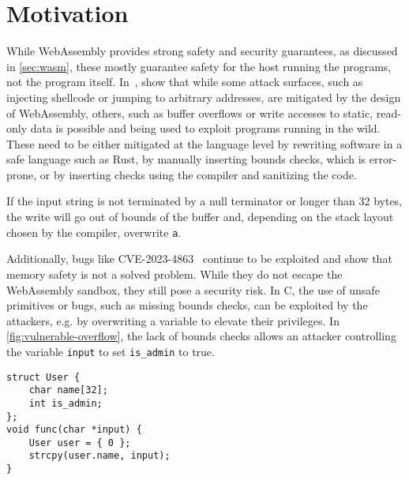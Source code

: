 \chapter{Motivation}
\label{ch:motivation}


While WebAssembly provides strong safety and security guarantees, as discussed in \cref{sec:wasm}, these mostly guarantee safety for the host running the programs, not the program itself.
In~\cite{lehmann2020everything}, \citeauthor*{lehmann2020everything} show that while some attack surfaces, such as injecting shellcode or jumping to arbitrary addresses, are mitigated by the design of WebAssembly, others, such as buffer overflows or write accesses to static, read-only data is possible and being used to exploit programs running in the wild.
These need to be either mitigated at the language level by rewriting software in a safe language such as Rust, by manually inserting bounds checks, which is error-prone, or by inserting checks using the compiler and sanitizing the code.

If the input string is not terminated by a null terminator or longer than 32 bytes, the write will go out of bounds of the buffer and, depending on the stack layout chosen by the compiler, overwrite \texttt{a}.

Additionally, bugs like {CVE-2023-4863}~\cite{CVE-2023-4863} continue to be exploited and show that memory safety is not a solved problem.
While they do not escape the WebAssembly sandbox, they still pose a security risk.
In C, the use of unsafe primitives or bugs, such as missing bounds checks, can be exploited by the attackers, e.g. by overwriting a variable to elevate their privileges.
In \cref{fig:vulnerable-overflow}, the lack of bounds checks allows an attacker controlling the variable \texttt{input} to set \texttt{is\_admin} to true.

\begin{figure*}
    \centering
    \begin{lstlisting}[frame=h,style=customc,label={lst:vulnerable-overflow}]
struct User {
    char name[32];
    int is_admin;
};
void func(char *input) {
    User user = { 0 };
    strcpy(user.name, input);
}
    \end{lstlisting}
    \caption{Vulnerable overflow}
    \label{fig:vulnerable-overflow}
\end{figure*}

